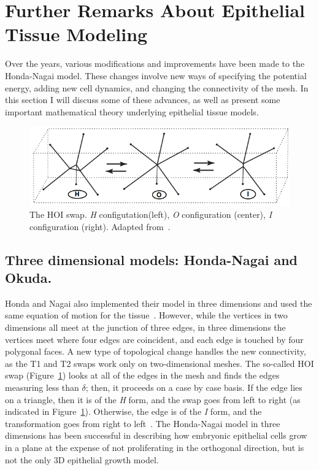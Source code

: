 \section{Further Remarks About Epithelial Tissue Modeling}
Over the years, various modifications and improvements have been made to the Honda-Nagai model. These changes involve new ways of specifying the potential energy, adding new cell dynamics, and changing the connectivity of the mesh. In this section I will discuss some of these advances, as well as present some important mathematical theory underlying epithelial tissue models.


\begin{figure}
\centering
\includegraphics[width=\textwidth]{../diagrams/hoi.png}
\caption[The HOI swap.]{The HOI swap. \emph{H} configutation(left), \emph{O} configuration (center), \emph{I} configuration (right). Adapted from~\cite{Honda3D}.}
\label{fig:hoi}
\end{figure}

\subsection{Three dimensional models: Honda-Nagai and Okuda.}
Honda and Nagai also implemented their model in three dimensions and used the same equation of motion for the tissue~\cite{Honda3D}. However, while the vertices in two dimensions all meet at the junction of three edges,  in three dimensions the vertices meet where four edges are coincident, and each edge is touched by four polygonal faces. A new type of topological change handles the new connectivity, as the T1 and T2 swaps work only on two-dimensional meshes. The so-called HOI swap (Figure~\ref{fig:hoi}) looks at all of the edges in the mesh and finds the edges measuring less than $\delta$; then, it proceeds on a case by case basis. If the edge lies on a triangle, then it is of the \emph{H} form, and the swap goes from left to right (as indicated in Figure~\ref{fig:hoi}). Otherwise, the edge is of the \emph{I} form, and the transformation goes from right to left~\cite{Honda3D}. The Honda-Nagai model in three dimensions has been successful in describing how embryonic epithelial cells grow in a plane at the expense of not proliferating in the orthogonal direction, but is not the only 3D epithelial growth model.

